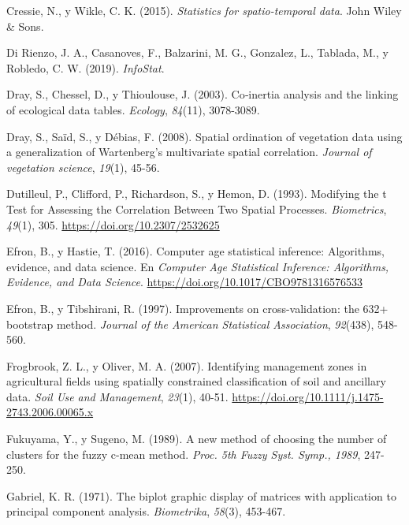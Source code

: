 \documentclass[11pt,b5paper,]{krantz}
\begin{document}
\hypertarget{ref-Cressie_Wikle_2015}{}
Cressie, N., y Wikle, C. K. (2015). \emph{Statistics for spatio-temporal
data}. John Wiley \& Sons.

\hypertarget{ref-Di_Rienzo_Casanoves_Balzarini_Gonzalez_Tablada_Robledo_2019}{}
Di Rienzo, J. A., Casanoves, F., Balzarini, M. G., Gonzalez, L.,
Tablada, M., y Robledo, C. W. (2019). \emph{InfoStat}.

\hypertarget{ref-Dray_Chessel_Thioulouse_2003}{}
Dray, S., Chessel, D., y Thioulouse, J. (2003). Co‐inertia analysis and
the linking of ecological data tables. \emph{Ecology}, \emph{84}(11),
3078-3089.

\hypertarget{ref-Dray_Sauxefd_Duxe9bias_2008}{}
Dray, S., Saïd, S., y Débias, F. (2008). Spatial ordination of
vegetation data using a generalization of Wartenberg's multivariate
spatial correlation. \emph{Journal of vegetation science}, \emph{19}(1),
45-56.

\hypertarget{ref-Dutilleul_Clifford_Richardson_Hemon_1993}{}
Dutilleul, P., Clifford, P., Richardson, S., y Hemon, D. (1993).
Modifying the t Test for Assessing the Correlation Between Two Spatial
Processes. \emph{Biometrics}, \emph{49}(1), 305.
\url{https://doi.org/10.2307/2532625}

\hypertarget{ref-Efron_Hastie_2016}{}
Efron, B., y Hastie, T. (2016). Computer age statistical inference:
Algorithms, evidence, and data science. En \emph{Computer Age
Statistical Inference: Algorithms, Evidence, and Data Science}.
\url{https://doi.org/10.1017/CBO9781316576533}

\hypertarget{ref-Efron_Tibshirani_1997}{}
Efron, B., y Tibshirani, R. (1997). Improvements on cross-validation:
the 632+ bootstrap method. \emph{Journal of the American Statistical
Association}, \emph{92}(438), 548-560.

\hypertarget{ref-Frogbrook_Oliver_2007}{}
Frogbrook, Z. L., y Oliver, M. A. (2007). Identifying management zones
in agricultural fields using spatially constrained classification of
soil and ancillary data. \emph{Soil Use and Management}, \emph{23}(1),
40-51. \url{https://doi.org/10.1111/j.1475-2743.2006.00065.x}

\hypertarget{ref-Fukuyama_Sugeno_1989}{}
Fukuyama, Y., y Sugeno, M. (1989). A new method of choosing the number
of clusters for the fuzzy c-mean method. \emph{Proc. 5th Fuzzy Syst.
Symp., 1989}, 247-250.

\hypertarget{ref-Gabriel_1971}{}
Gabriel, K. R. (1971). The biplot graphic display of matrices with
application to principal component analysis. \emph{Biometrika},
\emph{58}(3), 453-467.
\end{document}
